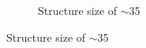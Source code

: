 \begin{figure}[ht]
\centering
    \begin{subfigure}[t]{0.3\linewidth}
	\centering
	\caption{Structure size of $\sim$35}
	\label{fig:b2d5_q5}
\end{subfigure}
\hspace*{5mm}

\end{figure}
